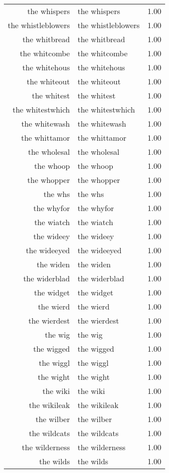 \begin{table}[ht]
\begin{tabular}{rlr}
  the whispers & the whispers & 1.00 \\ 
  the whistleblowers & the whistleblowers & 1.00 \\ 
  the whitbread & the whitbread & 1.00 \\ 
  the whitcombe & the whitcombe & 1.00 \\ 
  the whitehous & the whitehous & 1.00 \\ 
  the whiteout & the whiteout & 1.00 \\ 
  the whitest & the whitest & 1.00 \\ 
  the whitestwhich & the whitestwhich & 1.00 \\ 
  the whitewash & the whitewash & 1.00 \\ 
  the whittamor & the whittamor & 1.00 \\ 
  the wholesal & the wholesal & 1.00 \\ 
  the whoop & the whoop & 1.00 \\ 
  the whopper & the whopper & 1.00 \\ 
  the whs & the whs & 1.00 \\ 
  the whyfor & the whyfor & 1.00 \\ 
  the wiatch & the wiatch & 1.00 \\ 
  the wideey & the wideey & 1.00 \\ 
  the wideeyed & the wideeyed & 1.00 \\ 
  the widen & the widen & 1.00 \\ 
  the widerblad & the widerblad & 1.00 \\ 
  the widget & the widget & 1.00 \\ 
  the wierd & the wierd & 1.00 \\ 
  the wierdest & the wierdest & 1.00 \\ 
  the wig & the wig & 1.00 \\ 
  the wigged & the wigged & 1.00 \\ 
  the wiggl & the wiggl & 1.00 \\ 
  the wight & the wight & 1.00 \\ 
  the wiki & the wiki & 1.00 \\ 
  the wikileak & the wikileak & 1.00 \\ 
  the wilber & the wilber & 1.00 \\ 
  the wildcats & the wildcats & 1.00 \\ 
  the wilderness & the wilderness & 1.00 \\ 
  the wilds & the wilds & 1.00 \\ 

\end{tabular}
\end{table}

